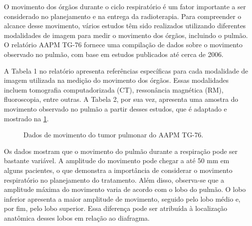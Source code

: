 \documentclass[11pt,a4paper]{article}
\begin{document}
	O movimento dos órgãos durante o ciclo respiratório é um fator importante a ser considerado no planejamento e na entrega da radioterapia. Para compreender o alcance desse movimento, vários estudos têm sido realizados utilizando diferentes modalidades de imagem para medir o movimento dos órgãos, incluindo o pulmão. O relatório AAPM TG-76 fornece uma compilação de dados sobre o movimento observado no pulmão, com base em estudos publicados até cerca de 2006.

	A Tabela 1 no relatório apresenta referências específicas para cada modalidade de imagem utilizada na medição do movimento dos órgãos. Essas modalidades incluem tomografia computadorizada (CT), ressonância magnética (RM), fluoroscopia, entre outras. A Tabela 2, por sua vez, apresenta uma amostra do movimento observado no pulmão a partir desses estudos, que é adaptado e mostrado na \ref{fig:gmrVariacaoPulmao}.

	\begin{figure}[h]
		\centering
		\caption{Dados de movimento do tumor pulmonar do AAPM TG-76.}
		\label{fig:gmrVariacaoPulmao}
	\end{figure}

	Os dados mostram que o movimento do pulmão durante a respiração pode ser bastante variável. A amplitude do movimento pode chegar a até 50 mm em alguns pacientes, o que demonstra a importância de considerar o movimento respiratório no planejamento do tratamento. Além disso, observa-se que a amplitude máxima do movimento varia de acordo com o lobo do pulmão. O lobo inferior apresenta a maior amplitude de movimento, seguido pelo lobo médio e, por fim, pelo lobo superior. Essa diferença pode ser atribuída à localização anatômica desses lobos em relação ao diafragma.
\end{document}
